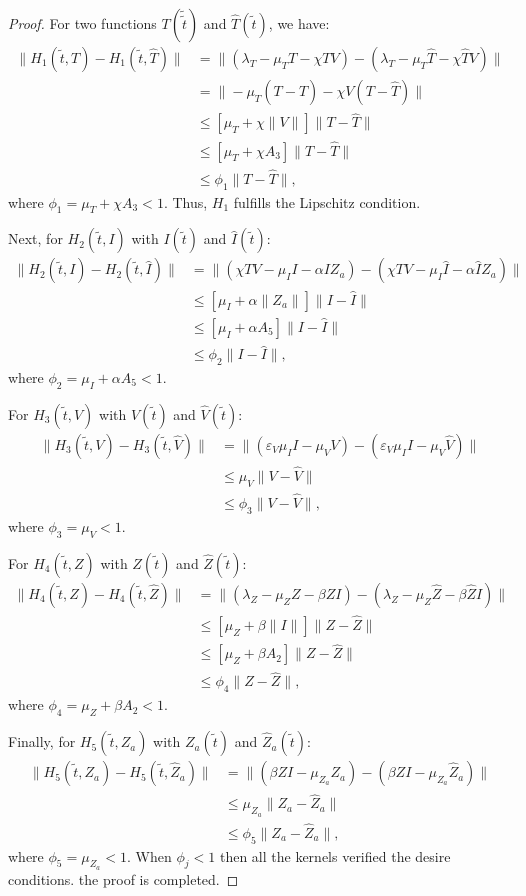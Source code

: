 \documentclass{article}
\theoremstyle{plain}
\theoremstyle{definition}
\numberwithin{equation}{section}
\begin{document}
\begin{proof}
For two functions $T(\tilde{\tilde{t}})$ and $\hat{T}(\tilde{t})$, we have:
	\begin{align*}
		\|H_1(\tilde{t}, T) - H_1(\tilde{t}, \hat{T})\| &= \|(\lambda_T - \mu_T T - \chi TV) - (\lambda_T - \mu_T \hat{T} - \chi \hat{T}V)\| \\
		&= \|-\mu_T(T - \hat{T}) - \chi V(T - \hat{T})\| \\
		&\leq [\mu_T + \chi \|V\|] \|T - \hat{T}\| \\
		&\leq [\mu_T + \chi A_3] \|T - \hat{T}\| \\
		&\leq \phi_1 \|T - \hat{T}\|,
	\end{align*}
	where $\phi_1 = \mu_T + \chi A_3 < 1$. Thus, $H_1$ fulfills the Lipschitz condition.
	
	Next, for $H_2(\tilde{t}, I)$ with $I(\tilde{t})$ and $\hat{I}(\tilde{t})$:
	\begin{align*}
		\|H_2(\tilde{t}, I) - H_2(\tilde{t}, \hat{I})\| &= \|(\chi TV - \mu_I I - \alpha I Z_a) - (\chi TV - \mu_I \hat{I} - \alpha \hat{I} Z_a)\| \\
		&\leq [\mu_I + \alpha \|Z_a\|] \|I - \hat{I}\| \\
		&\leq [\mu_I + \alpha A_5] \|I - \hat{I}\| \\
		&\leq \phi_2 \|I - \hat{I}\|,
	\end{align*}
	where $\phi_2 = \mu_I + \alpha A_5 < 1$.
	
	For $H_3(\tilde{t}, V)$ with $V(\tilde{t})$ and $\hat{V}(\tilde{t})$:
	\begin{align*}
		\|H_3(\tilde{t}, V) - H_3(\tilde{t}, \hat{V})\| &= \|(\varepsilon_V \mu_I I - \mu_V V) - (\varepsilon_V \mu_I I - \mu_V \hat{V})\| \\
		&\leq \mu_V \|V - \hat{V}\| \\
		&\leq \phi_3 \|V - \hat{V}\|,
	\end{align*}
	where $\phi_3 = \mu_V < 1$.
	
	For $H_4(\tilde{t}, Z)$ with $Z(\tilde{t})$ and $\hat{Z}(\tilde{t})$:
	\begin{align*}
		\|H_4(\tilde{t}, Z) - H_4(\tilde{t}, \hat{Z})\| &= \|(\lambda_Z - \mu_Z Z - \beta Z I) - (\lambda_Z - \mu_Z \hat{Z} - \beta \hat{Z} I)\| \\
		&\leq [\mu_Z + \beta \|I\|] \|Z - \hat{Z}\| \\
		&\leq [\mu_Z + \beta A_2] \|Z - \hat{Z}\| \\
		&\leq \phi_4 \|Z - \hat{Z}\|,
	\end{align*}
	where $\phi_4 = \mu_Z + \beta A_2 < 1$.
	
	Finally, for $H_5(\tilde{t}, Z_a)$ with $Z_{a}(\tilde{t})$ and $\hat{Z}_a(\tilde{t})$:
	\begin{align*}
		\|H_5(\tilde{t}, Z_a) - H_5(\tilde{t}, \hat{Z}_a)\| &= \|(\beta Z I - \mu_{Z_a} Z_a) - (\beta Z I - \mu_{Z_a} \hat{Z}_a)\| \\
		&\leq \mu_{Z_a} \|Z_a - \hat{Z}_a\| \\
		&\leq \phi_5 \|Z_a - \hat{Z}_a\|,
	\end{align*}
	where $\phi_5 = \mu_{Z_a} < 1$.
    When $\phi_j < 1$ then all the kernels verified the desire conditions.  the proof is completed.
\end{proof}
\end{document}
